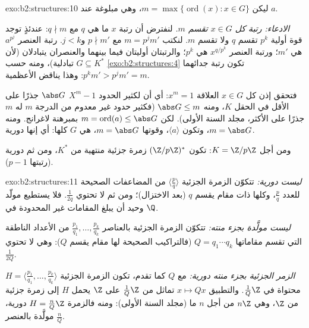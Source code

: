 \begin{solution}{exo:b2:structures:10}
ليكن $m = \max\{\operatorname{ord}(x) : x \in G\}$، وهي مبلوغة عند $a$.

\emph{الادعاء: رتبة كل $x \in G$ تقسم $m$.} لنفترض أن رتبة
$x$ ما هي $q$ مع $q \nmid m$: عندئذٍ توجد قوة أولية $p^k$
تقسم $q$ ولا تقسم $m$. لنكتب $m = p^j m'$ مع $p \nmid m'$ و$j
< k$. رتبة العنصر $a^{p^j}$ هي $m'$؛ ورتبة العنصر
$x^{q/p^k}$ هي $p^k$؛ والرتبتان أوليتان فيما بينهما والعنصران
يتبادلان (لأن $G \subseteq K^*$ تبادلية)، ومنه حسب
\cref{exo:b2:structures:4} تكون رتبة جدائهما $p^k m' > p^j m'
= m$: وهذا يناقض الأعظمية.

فتحقق إذن كل $x \in G$ العلاقة $x^m = 1$: أي أن لكثير الحدود $X^m - 1$
$\abs G$ جذرًا على الأقل في الحقل $K$، ومنه $\abs G \leq m$
(فكثير حدود غير معدوم من الدرجة $m$ له $m$ جذرًا على الأكثر، مجلد
السنة الأولى). لكن $m = \operatorname{ord}(a) \leq \abs G$ بمبرهنة لاغرانج.
ومنه $m = \abs G$، وتكون $\langle a \rangle$، وقوتها $m =
\abs G$، هي $G$ كلها: أي إنها دورية.

ومن أجل $K = \Z/p\Z$: تكون $(\Z/p\Z)^*$ زمرة جزئية منتهية من $K^*$، ومن ثم
دورية (رتبتها $p - 1$).
\end{solution}

\begin{solution}{exo:b2:structures:11}
\emph{ليست دورية:} تتكوّن الزمرة الجزئية $\langle \frac pq\rangle$
من المضاعفات الصحيحة للعدد $\frac pq$، وكلها ذات
مقام يقسم $q$ (بعد الاختزال)؛ ومن ثم لا تحتوي
$\frac{1}{2q}$. فلا يستطيع مولّد وحيد أن يبلغ المقامات غير
المحدودة في $\Q$.

\emph{ليست مولَّدة بجزء منته:} تتكوّن الزمرة الجزئية 
بالعناصر $\frac{p_1}{q_1}, \dots, \frac{p_k}{q_k}$ من الأعداد الناطقة
التي تقسم مقاماتها $Q = q_1 \cdots q_k$ (فالتراكيب الصحيحة
لها مقام يقسم $Q$): وهي لا تحتوي $\frac{1}{2Q}$.

\emph{الزمر الجزئية  بجزء منته دورية:} مع $Q$ كما تقدم،
تكون الزمرة الجزئية $H = \langle \frac{p_1}{q_1}, \dots,
\frac{p_k}{q_k}\rangle$ محتواة في $\frac{1}{Q}\Z$. والتطبيق $x
\mapsto Qx$ تماثل من $\frac1Q\Z$ على $\Z$ يحمل
$H$ إلى زمرة جزئية من $\Z$، وهي $n\Z$ من أجل $n$ ما (مجلد
السنة الأولى): ومنه فالزمرة $H = \frac{n}{Q}\Z$ دورية، مولَّدة بالعنصر
$\frac nQ$.
\end{solution}

